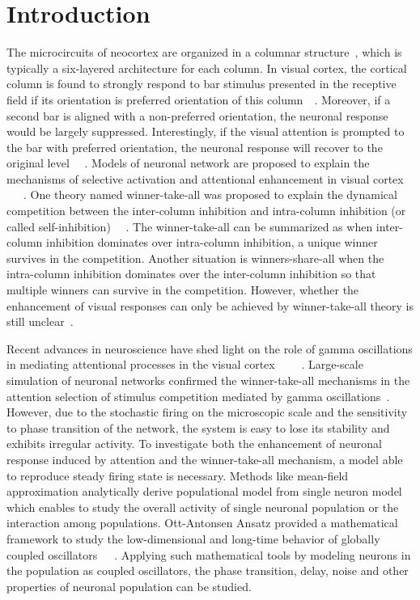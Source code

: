 \documentclass[10pt,letterpaper]{article}
\begin{document}
\linenumbers

\section*{Introduction}
The microcircuits of neocortex are organized in a columnar structure~\cite{Mountcastle1957}, which is typically a six-layered architecture for each column. In visual cortex, the cortical column is found to strongly respond to bar stimulus presented in the receptive field if its orientation is preferred orientation of this column~\cite{hubel1959}~\cite{reynolds1999}. Moreover, if a second bar is aligned with a non-preferred orientation, the neuronal response would be largely suppressed. Interestingly, if the visual attention is prompted to the bar with preferred orientation, the neuronal response will recover to the original level ~\cite{reynolds1999}~\cite{luck1997}. Models of neuronal network are proposed to explain the mechanisms of selective activation and attentional enhancement in visual cortex ~\cite{reynolds1999}~\cite{boynton2005}~\cite{buia2008}. One theory named winner-take-all was proposed to explain the dynamical competition between the inter-column inhibition and intra-column inhibition (or called self-inhibition) ~\cite{fukai1997}~\cite{wagatsuma2011}. The winner-take-all can be summarized as when inter-column inhibition dominates over intra-column inhibition, a unique winner survives in the competition. Another situation is winners-share-all when the intra-column inhibition dominates over the inter-column inhibition so that multiple winners can survive in the competition. However, whether the enhancement of visual responses can only be achieved by winner-take-all theory is still unclear~\cite{dieter2016}. 

Recent advances in neuroscience have shed light on the role of gamma oscillations in mediating attentional processes in the visual cortex ~\cite{fries2009}~\cite{tiesinga2009}~\cite{ardid2010}~\cite{magazzini2018}. Large-scale simulation of neuronal networks confirmed the winner-take-all mechanisms in the attention selection of stimulus competition mediated by gamma oscillations~\cite{borgers2008}. However, due to the stochastic firing on the microscopic scale and the sensitivity to phase transition of the network, the system is easy to lose its stability and exhibits irregular activity. To investigate both the enhancement of neuronal response induced by attention and the winner-take-all mechanism, a model able to reproduce steady firing state is necessary. Methods like mean-field approximation analytically derive populational model from single neuron model which enables to study the overall activity of single neuronal population or the interaction among populations. Ott-Antonsen Ansatz provided a mathematical framework to study the low-dimensional and long-time behavior of globally coupled oscillators~\cite{ott2008}~\cite{ott2009}~\cite{montbrio2015}. Applying such mathematical tools by modeling neurons in the population as coupled oscillators, the phase transition, delay, noise and other properties of neuronal population can be studied. 
\end{document}
